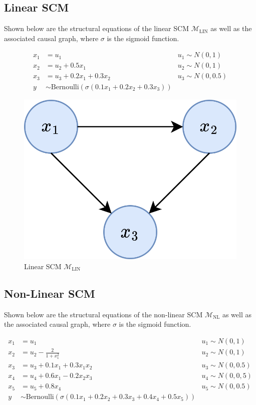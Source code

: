 \subsection{Linear SCM} \label{section:linear_scm}

Shown below are the structural equations of the linear SCM $\mathcal{M}_{\text{LIN}}$ as well as the associated causal graph, where $\sigma$ is the sigmoid function.

\begin{align} \label{eq:linear_scm_structural_equations}
	x_1 & = u_1 & u_1 \sim N(0,1) \\ \nonumber
	x_2 & = u_2 + 0.5x_1 & u_2 \sim N(0,1) \\ \nonumber
	x_3 & = u_3 + 0.2x_1 + 0.3x_2 & u_3 \sim N(0,0.5) \\ \nonumber
	y   & \sim \text{Bernoulli}(\sigma(0.1x_1 + 0.2x_2 + 0.3x_3))
\end{align}

\begin{figure}[!htb]
	\centering
	\includegraphics[width=0.4\linewidth]{images/draw.io/toy_scm.png}
	\caption{Linear SCM $\mathcal{M}_{\text{LIN}}$}
	\label{fig:simple_scm}
\end{figure}

\subsection{Non-Linear SCM}

Shown below are the structural equations of the non-linear SCM $\mathcal{M}_{\text{NL}}$ as well as the associated causal graph, where $\sigma$ is the sigmoid function.

\begin{align}
	x_1 & = u_1 & u_1 \sim N(0,1) \\ \nonumber
	x_2 & = u_2 - \frac{2}{1 + x_1^2} & u_2 \sim N(0,1) \\ \nonumber
	x_3 & = u_3 + 0.1x_1 + 0.3x_1x_2 & u_3 \sim N(0,0.5) \\ \nonumber
	x_4 & = u_4 + 0.6x_1 - 0.2x_2x_3 & u_4 \sim N(0,0,5) \\ \nonumber
	x_5 & = u_5 + 0.8x_4 & u_5 \sim N(0,0.5) \\ \nonumber
	y   & \sim \text{Bernoulli}(\sigma(0.1x_1 + 0.2x_2 + 0.3x_3 + 0.4x_4 + 0.5x_5))
\end{align}

